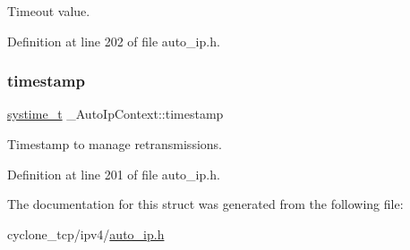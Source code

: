 Timeout value. 



Definition at line 202 of file auto\+\_\+ip.\+h.

\mbox{\label{struct__AutoIpContext_aec2d3543fe0ddd32bef9bd32a1869082}} 
\subsubsection{\texorpdfstring{timestamp}{timestamp}}
{\footnotesize\ttfamily \hyperlink{compiler__port_8h_ae3e32a98d431a02106616da3071832dd}{systime\+\_\+t} \+\_\+\+Auto\+Ip\+Context\+::timestamp}



Timestamp to manage retransmissions. 



Definition at line 201 of file auto\+\_\+ip.\+h.



The documentation for this struct was generated from the following file\+:\begin{DoxyCompactItemize}
\item 
cyclone\+\_\+tcp/ipv4/\hyperlink{auto__ip_8h}{auto\+\_\+ip.\+h}\end{DoxyCompactItemize}
